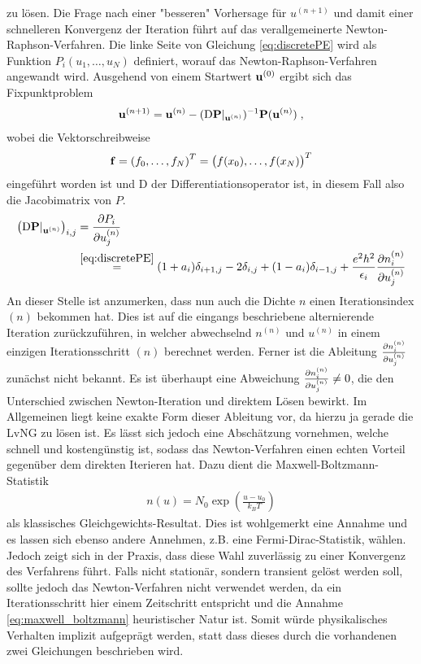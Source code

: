 zu lösen. Die Frage nach einer "besseren" Vorhersage für $u^{(n+1)}$ und damit einer schnelleren Konvergenz der Iteration führt auf das verallgemeinerte Newton-Raphson-Verfahren.
Die linke Seite von Gleichung \eqref{eq:discretePE} wird als Funktion $P_i(u_1,\dots,u_N)$ definiert, worauf das Newton-Raphson-Verfahren angewandt wird. Ausgehend von einem Startwert $\vb{u}^{(0)}$ ergibt sich das Fixpunktproblem
\begin{align}
  \vb{u}^{(n+1)} = \vb{u}^{(n)} - (\mathrm{D}\vb{P}|_{\vb{u}^{(n)}})^{-1} \vb{P}(\vb{u}^{(n)}) \; ,
  \label{eq:fixpunkt_gummel}
\end{align}
wobei die Vektorschreibweise
\begin{align}
  \vb{f} = \left( f_0,\dots,f_N\right)^T = \left( f(x_0),\dots,f(x_N)\right)^T
\end{align}
eingeführt worden ist und $\mathrm{D}$ der Differentiationsoperator ist, in diesem Fall also die Jacobimatrix von $P$.
\begin{align}
  \left(\mathrm{D}\vb{P}|_{\vb{u}^{(n)}}\right)_{i,j} &= \frac{\mathrm{\partial}P_i}{\mathrm{\partial}u_j^{(n)}} \\ &\stackrel{\eqref{eq:discretePE}}{=}
  (1+a_i)\delta_{i+1,j} - 2 \delta_{i,j} + (1-a_i)\delta_{i-1,j} + \frac{e^2h^2}{\epsilon_i}\frac{\mathrm{\partial}n_i^{(n)}}{\mathrm{\partial}u_j^{(n)}}
\end{align}
An dieser Stelle ist anzumerken, dass nun auch die Dichte $n$ einen Iterationsindex $(n)$ bekommen hat. Dies ist auf die eingangs beschriebene alternierende Iteration zurückzuführen, in welcher abwechselnd $n^{(n)}$ und $u^{(n)}$ in einem einzigen Iterationsschritt $(n)$ berechnet werden. Ferner ist die Ableitung $\frac{\mathrm{\partial}n_i^{(n)}}{\mathrm{\partial}u_j^{(n)}}$ zunächst nicht bekannt.
Es ist überhaupt eine Abweichung $\frac{\mathrm{\partial}n_i^{(n)}}{\mathrm{\partial}u_j^{(n)}} \neq 0$, die den Unterschied zwischen Newton-Iteration und direktem Lösen bewirkt. Im Allgemeinen liegt keine exakte Form dieser Ableitung vor, da hierzu ja gerade die LvNG zu lösen ist. Es lässt sich jedoch eine Abschätzung vornehmen, welche schnell und kostengünstig ist, sodass das Newton-Verfahren einen echten Vorteil gegenüber dem direkten Iterieren hat. Dazu dient die Maxwell-Boltzmann-Statistik
\begin{align}
  n(u) = N_0\exp\left(\frac{u-u_0}{k_B T}\right)
  \label{eq:maxwell_boltzmann}
\end{align}
als klassisches Gleichgewichts-Resultat. Dies ist wohlgemerkt eine Annahme und es lassen sich ebenso andere Annehmen, z.B. eine Fermi-Dirac-Statistik, wählen. Jedoch zeigt sich in der Praxis, dass diese Wahl zuverlässig zu einer Konvergenz des Verfahrens führt. Falls nicht stationär, sondern transient gelöst werden soll, sollte jedoch das Newton-Verfahren nicht verwendet werden, da ein Iterationsschritt hier einem Zeitschritt entspricht und die Annahme \eqref{eq:maxwell_boltzmann} heuristischer Natur ist. Somit würde physikalisches Verhalten implizit aufgeprägt werden, statt dass dieses durch die vorhandenen zwei Gleichungen beschrieben wird.

